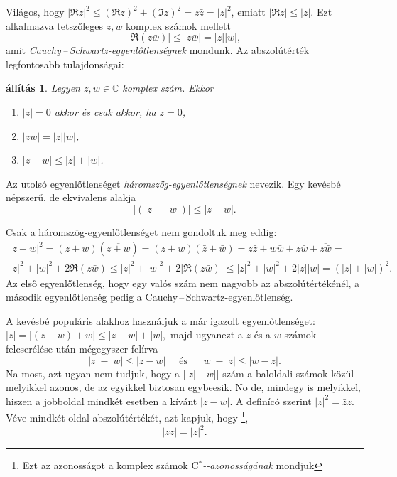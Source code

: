 \documentclass[a4paper, showtrims]{memoir}
\makeatletter
\renewenvironment{proof}[1][\proofname]
    {\par\pushQED{\qed}%
    \normalfont \topsep6\p@\@plus6\p@\relax
    \trivlist
    \item[\hskip\labelsep
        \itshape
    #1\@addpunct{:}]\ignorespaces}
    {\popQED\endtrivlist\@endpefalse}
\theoremstyle{plain}
\newtheorem{proposition}{állítás}[chapter]
\theoremstyle{remark}
\theoremstyle{definition}
\newcommand{\Star}[1]{#1\ensuremath{^*}\kern-\scriptspace}
\newcommand{\CStar}{\Star{\ensuremath{\mathrm{C}}}}
\makeatother
\begin{document}
Világos, hogy $|\Re z|^2\leq(\Re z)^2+(\Im z)^2=z\bar{z}=|z|^2$, emiatt
\(
|\Re z|\leq |z|.
\)
Ezt alkalmazva tetszőleges $z,w$ komplex számok mellett
\[
	|
	\Re (z\bar{w})
	|
	\leq
	|z\bar{w}|
	=
	|z||w|,
\]
amit \emph{Cauchy\,--\,Schwartz-egyenlőtlenségnek} mondunk.
Az abszolútérték legfontosabb tulajdonságai:
\begin{proposition}
	Legyen $z,w\in\mathbb{C}$ komplex szám.
	Ekkor
	\begin{enumerate}
		\item $|z|=0$ akkor és csak akkor, ha $z=0$,
		\item $|zw|=|z||w|$,
		\item $|z+w|\leq |z|+|w|$.\qedhere
	\end{enumerate}
\end{proposition}
Az utolsó egyenlőtlenséget \emph{háromszög-egyenlőtlenségnek} nevezik.
Egy kevésbé népszerű, de ekvivalens alakja
\[
	\left|\left( |z|-|w| \right)\right|\leq|z-w|.
\]
\begin{proof}
	Csak a háromszög-egyenlőtlenséget nem gondoltuk meg eddig:
	\begin{multline*}
		|z+w|^2=
		\left( z+w \right)\left( \overline{z+w} \right)
		=
		\left( z+w \right)\left( \bar{z}+\bar{w} \right)
		=
		z\bar{z}+w\bar{w}+z\bar{w}+\overline{z\bar{w}}
		=
		\\
		|z|^2+|w|^2+2\Re (z\bar{w})
		\leq
		|z|^2+|w|^2+2|\Re (z\bar{w})|
		\leq
		|z|^2+|w|^2+2|z||w|
		=
		\left( |z|+|w| \right)^2.
	\end{multline*}
	Az első egyenlőtlenség, hogy egy valós szám nem nagyobb az abszolútértékénél,
	a második egyenlőtlenség pedig a Cauchy\,--\,Schwartz-egyenlőtlenség.

	A kevésbé populáris alakhoz használjuk a már igazolt egyenlőtlenséget:
	\begin{math}
		|z|
		=
		|(z-w)+w|
		\leq
		|z-w|+|w|,
	\end{math}
	majd ugyanezt a $z$ és a $w$ számok felcserélése után mégegyszer felírva
	\[
		|z|-|w|\leq |z-w|
		\quad\text{ és }\quad
		|w|-|z|\leq |w-z|.
	\]
	Na most, azt ugyan nem tudjuk, hogy a $||z|-|w||$ szám a baloldali számok közül melyikkel azonos,
	de az egyikkel biztosan egybeesik.
	No de, mindegy is melyikkel, hiszen a jobboldal mindkét esetben a kívánt $|z-w|$.
\end{proof}
A definícó szerint $|z|^2=\bar{z}z$.
Véve mindkét oldal abszolútértékét,
azt kapjuk, hogy%
\footnote{Ezt az azonosságot a komplex számok
	\emph{\CStar-azonosságának}\index{Ccsillag@\CStar-azonosság}
	mondjuk},
\[
	|\bar{z}z|=|z|^2.
\]%
\end{document}
